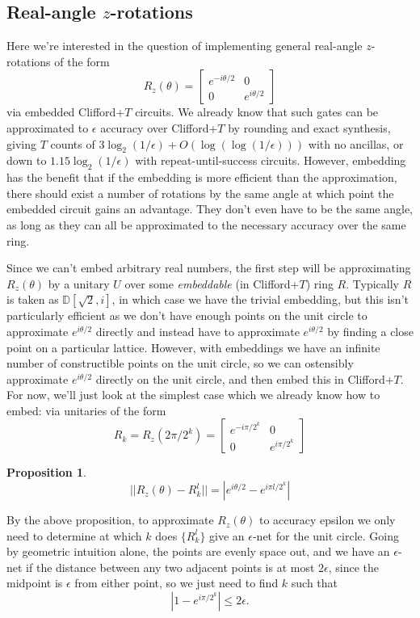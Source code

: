 \documentclass{article}
\theoremstyle{definition}
\theoremstyle{theorem}
\newtheorem{proposition}{Proposition}
\theoremstyle{remark}
\begin{document}
\subsection{Real-angle $z$-rotations}

Here we're interested in the question of implementing general real-angle $z$-rotations of the form
\[
	R_z(\theta) = \begin{bmatrix} e^{-i\theta/2} & 0 \\ 0 & e^{i\theta/2} \end{bmatrix}
\]
via embedded Clifford+$T$ circuits. We already know that such gates can be approximated to $\epsilon$ accuracy over Clifford+$T$ by rounding and exact synthesis, giving $T$ counts of $3\log_2(1/\epsilon) + O(\log(\log(1/\epsilon)))$ with no ancillas, or down to $1.15\log_2(1/\epsilon)$ with repeat-until-success circuits. However, embedding has the benefit that if the embedding is more efficient than the approximation, there should exist a number of rotations by the same angle at which point the embedded circuit gains an advantage. They don't even have to be the same angle, as long as they can all be approximated to the necessary accuracy over the same ring.

Since we can't embed arbitrary real numbers, the first step will be approximating $R_z(\theta)$ by a unitary $U$ over some \emph{embeddable} (in Clifford+$T$) ring $R$. Typically $R$ is taken as $\mathbb{D}[\sqrt{2},i]$, in which case we have the trivial embedding, but this isn't particularly efficient as we don't have enough points on the unit circle to approximate $e^{i\theta/2}$ directly and instead have to approximate $e^{i\theta/2}$ by finding a close point on a particular lattice. However, with embeddings we have an infinite number of constructible points on the unit circle, so we can ostensibly approximate $e^{i\theta/2}$ directly on the unit circle, and then embed this in Clifford+$T$. For now, we'll just look at the simplest case which we already know how to embed: via unitaries of the form
\[
	R_k=R_z(2\pi/2^k) = \begin{bmatrix} e^{-i\pi/2^k} & 0 \\ 0 & e^{i\pi/2^k} \end{bmatrix}
\]

\begin{proposition}
	\[ || R_z(\theta) - R_k^l || = | e^{i\theta/2} - e^{i\pi l/2^k} | \]
\end{proposition}

By the above proposition, to approximate $R_z(\theta)$ to accuracy epsilon we only need to determine at which $k$ does $\{R_k^l\}$ give an $\epsilon$-net for the unit circle. Going by geometric intuition alone, the points are evenly space out, and we have an $\epsilon$-net if the distance between any two adjacent points is at most $2\epsilon$, since the midpoint is $\epsilon$ from either point, so we just need to find $k$ such that
\[
	|1 - e^{i\pi/2^k}| \leq 2\epsilon.
\]
\end{document}
